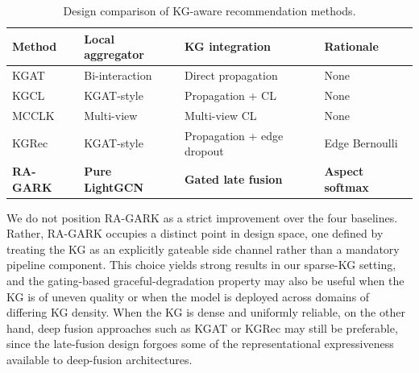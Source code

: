 \begin{table}[!htbp]
\centering
\caption{Design comparison of KG-aware recommendation methods.}
\label{tab:rw-summary}
\begin{tabular}{l l l l}
\toprule
Method & Local aggregator & KG integration & Rationale \\
\midrule
KGAT       & Bi-interaction  & Direct propagation         & None \\
KGCL       & KGAT-style      & Propagation + CL           & None \\
MCCLK      & Multi-view      & Multi-view CL              & None \\
KGRec      & KGAT-style      & Propagation + edge dropout & Edge Bernoulli \\
\midrule
\textbf{RA-GARK} & \textbf{Pure LightGCN} & \textbf{Gated late fusion} & \textbf{Aspect softmax} \\
\bottomrule
\end{tabular}
\end{table}
\FloatBarrier

We do not position RA-GARK as a strict improvement over the four baselines. Rather, RA-GARK occupies a distinct point in design space, one defined by treating the KG as an explicitly gateable side channel rather than a mandatory pipeline component. This choice yields strong results in our sparse-KG setting, and the gating-based graceful-degradation property may also be useful when the KG is of uneven quality or when the model is deployed across domains of differing KG density. When the KG is dense and uniformly reliable, on the other hand, deep fusion approaches such as KGAT or KGRec may still be preferable, since the late-fusion design forgoes some of the representational expressiveness available to deep-fusion architectures.
